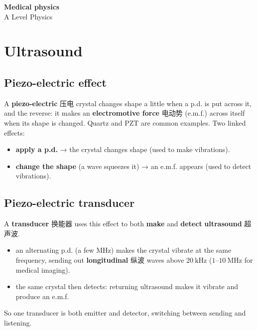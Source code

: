 \documentclass[11pt]{article}
\begin{document}
\begin{center}
  {\LARGE\bfseries Medical physics}\\[0.35em]
  {\large A Level Physics}
\end{center}
\vspace{0.6em}

\section*{Ultrasound}

\subsection*{Piezo-electric effect}

A \textbf{piezo-electric} 压电 crystal changes shape a little when a p.d. is put across it, and the reverse: it makes an \textbf{electromotive force} 电动势 (e.m.f.) across itself when its shape is changed. Quartz and PZT are common examples. Two linked effects:

\begin{itemize}
\item \textbf{apply a p.d.} → the crystal changes shape (used to make vibrations).

\item \textbf{change the shape} (a wave squeezes it) → an e.m.f. appears (used to detect vibrations).

\end{itemize}

\subsection*{Piezo-electric transducer}

A \textbf{transducer} 换能器 uses this effect to both \textbf{make} and \textbf{detect} \textbf{ultrasound} 超声波.

\begin{itemize}
\item an alternating p.d. (a few MHz) makes the crystal vibrate at the same frequency, sending out \textbf{longitudinal} 纵波 waves above $20\ \text{kHz}$ ($1$–$10\ \text{MHz}$ for medical imaging).

\item the same crystal then detects: returning ultrasound makes it vibrate and produce an e.m.f.

\end{itemize}

So one transducer is both emitter and detector, switching between sending and listening.
\end{document}
